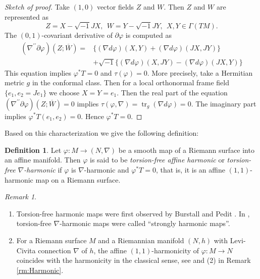 \documentclass[12pt]{amsart}
\theoremstyle{definition}
\newtheorem{Definition}{Definition}[section]
\theoremstyle{remark}
\newtheorem{Remark}[Theorem]{Remark}
\numberwithin{equation}{section}
\begin{document}
\begin{proof}[Sketch of proof]
Take $(1,0)$ vector fields $Z$ and $W$.
Then $Z$ and $W$ are represented as
\begin{equation*}
Z=X-\sqrt{-1}JX, \ \ W=Y-\sqrt{-1}JY,\ \ 
X,Y\in \varGamma(TM).
\end{equation*}
The $(0,1)$-covariant derivative of 
$\partial\varphi$ is computed as
\begin{align*}
(\nabla^{\prime\prime}\partial \varphi)(Z;\overline{W})
=&
\{
(\nabla d\varphi)(X,Y)+(\nabla d\varphi)(JX, JY)
\}
\\
&
+ \sqrt{-1}
\{
(\nabla d\varphi)(X,JY)-(\nabla d\varphi)(JX, Y)
\}
\end{align*}
 This equation implies  
 $\varphi^{*}T=0$ and $\tau(\varphi)=0$. 
 More precisely, take 
 a Hermitian metric $g$ in the conformal class.
 Then for  a local orthonormal frame field $\{e_1,e_2=Je_1\}$
 we choose 
 $X=Y=e_1.$ Then the real part of the 
 equation $(\nabla^{\prime\prime}\partial \varphi)(Z;\overline{W})
 =0$ implies $\tau(\varphi , \nabla) = {\operatorname {tr}_g} (\nabla d \varphi)=0$. 
 The imaginary part implies 
 $\varphi^{*}T(e_1,e_2)=0$. Hence 
 $\varphi^{*}T=0$.
 \end{proof}
 Based on this characterization we give the following definition:
\begin{Definition}\label{def:stronglyharmonic}
 Let $\varphi:M\to (N,\nabla)$ be a smooth map of a Riemann surface 
 into an affine manifold. Then $\varphi$ is said to be 
 \textit{torsion-free affine harmonic} or
 \textit{torsion-free $\nabla$-harmonic}  if $\varphi$ is 
 $\nabla$-harmonic and $\varphi^{*}T=0$, that is, 
 it is an affine $(1,1)$-harmonic map on a Riemann surface. 
\end{Definition}
\begin{Remark}
\mbox{}
\begin{enumerate}
\item
 Torsion-free harmonic maps were first observed by 
 Burstall and Pedit \cite{BP}. 
 In \cite{Khemar},  torsion-free $\nabla$-harmonic maps were 
 called ``strongly harmonic maps''.

\item For a Riemann surface $M$ and a Riemannian manifold 
 $(N,h)$ with Levi-Civita connection $\nabla$ of $h$,
 the affine $(1, 1)$-harmonicity of $\varphi : M \to N$
 coincides with the harmonicity in the classical sense, 
 see \cite{EL} and (2) in Remark \ref{rm:Harmonic}.
 \end{enumerate}
\end{Remark}
\end{document}
